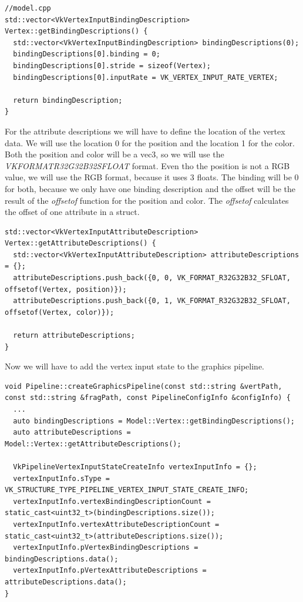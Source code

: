 \documentclass[12pt]{report} \usepackage{preamble}
\begin{document}
\begin{lstlisting}[Language=C++]
//model.cpp
std::vector<VkVertexInputBindingDescription> Vertex::getBindingDescriptions() {
  std::vector<VkVertexInputBindingDescription> bindingDescriptions(0);
  bindingDescriptions[0].binding = 0;
  bindingDescriptions[0].stride = sizeof(Vertex);
  bindingDescriptions[0].inputRate = VK_VERTEX_INPUT_RATE_VERTEX;

  return bindingDescription;
}
\end{lstlisting}

For the attribute descriptions we will have to define the location of the vertex data. We will use the location 0 for the position and the location 1 for the color.
Both the position and color will be a vec3, so we will use the \textit{VK\textunderscore FORMAT\textunderscore R32G32B32\textunderscore SFLOAT} format.
Even tho the position is not a RGB value, we will use the RGB format, because it uses 3 floats.
The binding will be 0 for both, because we only have one binding description and the offset will be the result of the \textit{offsetof} function for the position and color.
The \textit{offsetof} calculates the offset of one attribute in a struct.

\begin{lstlisting}[Language=C++]
std::vector<VkVertexInputAttributeDescription> Vertex::getAttributeDescriptions() {
  std::vector<VkVertexInputAttributeDescription> attributeDescriptions = {};
  attributeDescriptions.push_back({0, 0, VK_FORMAT_R32G32B32_SFLOAT, offsetof(Vertex, position)});
  attributeDescriptions.push_back({0, 1, VK_FORMAT_R32G32B32_SFLOAT, offsetof(Vertex, color)});

  return attributeDescriptions;
}
\end{lstlisting}

Now we will have to add the vertex input state to the graphics pipeline.

\begin{lstlisting}[Language=C++]
void Pipeline::createGraphicsPipeline(const std::string &vertPath, const std::string &fragPath, const PipelineConfigInfo &configInfo) {
  ...
  auto bindingDescriptions = Model::Vertex::getBindingDescriptions();
  auto attributeDescriptions = Model::Vertex::getAttributeDescriptions();

  VkPipelineVertexInputStateCreateInfo vertexInputInfo = {};
  vertexInputInfo.sType = VK_STRUCTURE_TYPE_PIPELINE_VERTEX_INPUT_STATE_CREATE_INFO;
  vertexInputInfo.vertexBindingDescriptionCount = static_cast<uint32_t>(bindingDescriptions.size());
  vertexInputInfo.vertexAttributeDescriptionCount = static_cast<uint32_t>(attributeDescriptions.size());
  vertexInputInfo.pVertexBindingDescriptions = bindingDescriptions.data();
  vertexInputInfo.pVertexAttributeDescriptions = attributeDescriptions.data();
}
\end{lstlisting}
\end{document}
